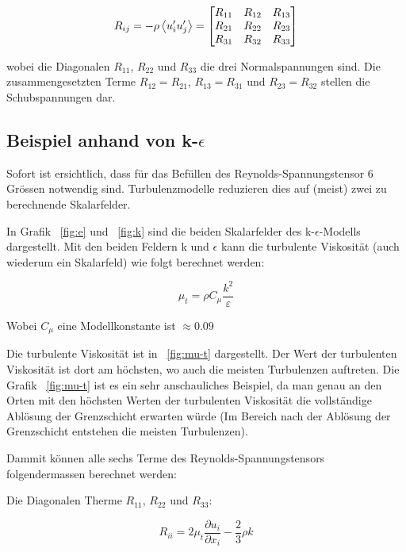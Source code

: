 \begin{equation}
    R_{ij} = -\rho\left\langle u'_i u'_j \right\rangle = \begin{bmatrix}
    R_{11} & R_{12} & R_{13} \\
    R_{21} & R_{22} & R_{23} \\
    R_{31} & R_{32} & R_{33}
    \end{bmatrix}
\end{equation}

wobei die Diagonalen $R_{11}$, $R_{22}$ und $R_{33}$ die drei Normalspannungen sind.
Die zusammengesetzten Terme $R_{12} = R_{21}$, $R_{13} = R_{31}$ und $R_{23} = R_{32}$ stellen
die Schubspannungen dar.

\subsection{Beispiel anhand von k-$\epsilon$}

Sofort ist ersichtlich, dass für das Befüllen des Reynolds-Spannungstensor 6 Grössen notwendig sind.
Turbulenzmodelle reduzieren dies auf (meist) zwei zu berechnende Skalarfelder.


In Grafik ~\ref{fig:e} und ~\ref{fig:k} sind die beiden Skalarfelder des k-$\epsilon$-Modells dargestellt.
Mit den beiden Feldern k und $\epsilon$ kann die turbulente Viskosität (auch wiederum ein Skalarfeld) wie
folgt berechnet werden:

\begin{equation}
    \label{eqs:Turbulent-Viscosity}
    \mu_t = \rho C_\mu \frac{k^2}{\varepsilon}
\end{equation}

Wobei $C_\mu$ eine Modellkonstante ist $\approx 0.09$

Die turbulente Viskosität ist in ~\ref{fig:mu-t} dargestellt.
Der Wert der turbulenten Viskosität ist dort am höchsten, wo auch die meisten Turbulenzen auftreten.
Die Grafik ~\ref{fig:mu-t} ist es ein sehr anschauliches Beispiel,
da man genau an den Orten mit den höchsten Werten der turbulenten Viskosität die vollständige Ablösung
der Grenzschicht erwarten würde (Im Bereich nach der Ablösung der Grenzschicht entstehen die meisten Turbulenzen).

Dammit können alle sechs Terme des Reynolds-Spannungstensors folgendermassen berechnet werden:

Die Diagonalen Therme $R_{11}$, $R_{22}$ und $R_{33}$:

\begin{equation}
    R_{ii} = 2 \mu_t \frac{\partial u_i}{\partial x_i} - \frac{2}{3}\rho k
\end{equation}

